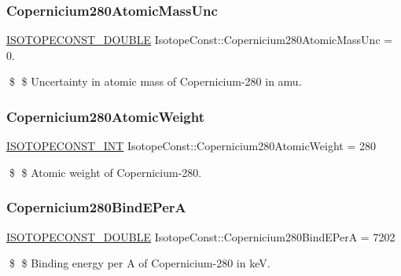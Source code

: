 \subsubsection{\texorpdfstring{Copernicium280\+Atomic\+Mass\+Unc}{Copernicium280AtomicMassUnc}}
{\footnotesize\ttfamily \mbox{\hyperlink{group___isotope_const-_macros_ga8f45a7272ce02c0b4c65c44636ed719a}{I\+S\+O\+T\+O\+P\+E\+C\+O\+N\+S\+T\+\_\+\+D\+O\+U\+B\+LE}} Isotope\+Const\+::\+Copernicium280\+Atomic\+Mass\+Unc = 0.}

\$ \$ Uncertainty in atomic mass of Copernicium-\/280 in amu. \mbox{\label{group___isotope_const-_copernicium-_cn280_gad5c4112b1f713c410000a5a5ab435b3c}} 
\subsubsection{\texorpdfstring{Copernicium280\+Atomic\+Weight}{Copernicium280AtomicWeight}}
{\footnotesize\ttfamily \mbox{\hyperlink{group___isotope_const-_macros_ga5f18360b3e99483a35c32d789e62621c}{I\+S\+O\+T\+O\+P\+E\+C\+O\+N\+S\+T\+\_\+\+I\+NT}} Isotope\+Const\+::\+Copernicium280\+Atomic\+Weight = 280}

\$ \$ Atomic weight of Copernicium-\/280. \mbox{\label{group___isotope_const-_copernicium-_cn280_ga9ddca92c5b3a07ae43d83a78d5b75739}} 
\subsubsection{\texorpdfstring{Copernicium280\+Bind\+E\+PerA}{Copernicium280BindEPerA}}
{\footnotesize\ttfamily \mbox{\hyperlink{group___isotope_const-_macros_ga8f45a7272ce02c0b4c65c44636ed719a}{I\+S\+O\+T\+O\+P\+E\+C\+O\+N\+S\+T\+\_\+\+D\+O\+U\+B\+LE}} Isotope\+Const\+::\+Copernicium280\+Bind\+E\+PerA = 7202}

\$ \$ Binding energy per A of Copernicium-\/280 in keV. \mbox{\label{group___isotope_const-_copernicium-_cn280_gaa9a0126ce0ffa73fafa359c98f4da839}} 
